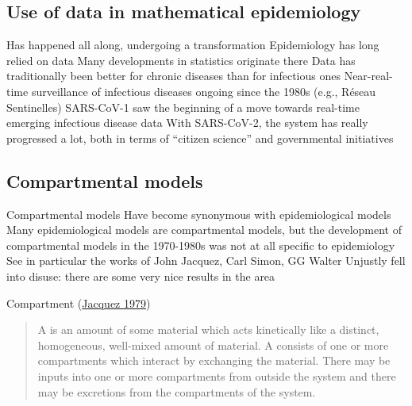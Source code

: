 \documentclass[aspectratio=169]{beamer}\usepackage[]{graphicx}\usepackage[]{xcolor}
\begin{document}
\subsection{Use of data in mathematical epidemiology}


\begin{frame}{Has happened all along, undergoing a transformation}
\bbullet Epidemiology has long relied on data
\vfill
\bbullet Many developments in statistics originate there
\vfill
\bbullet Data has traditionally been better for chronic diseases than for infectious ones
\vfill
\bbullet Near-real-time surveillance of infectious diseases ongoing since the 1980s (e.g., Réseau Sentinelles)
\vfill
\bbullet SARS-CoV-1 saw the beginning of a move towards real-time emerging infectious disease data
\vfill
\bbullet With SARS-CoV-2, the system has really progressed a lot, both in terms of ``citizen science'' and governmental initiatives
\end{frame}



\subsection{Compartmental models}


\begin{frame}{Compartmental models}
\bbullet Have become synonymous with epidemiological models
\vfill
\bbullet Many epidemiological models are compartmental models, but the development of compartmental models in the 1970-1980s was not at all specific to epidemiology
\vfill
\bbullet See in particular the works of John Jacquez, Carl Simon, GG Walter
\vfill
\bbullet Unjustly fell into disuse: there are some very nice results in the area    
\end{frame}

\begin{frame}{Compartment (\href{https://doi-org.uml.idm.oclc.org/10.1016/B978-0-12-434180-7.50021-8}{Jacquez 1979})}

\begin{quote}
  A  is an amount of some material which acts kinetically like a distinct, homogeneous, well-mixed amount of material. A  consists of one or more compartments which interact by exchanging the material. There may be inputs into one or more compartments from outside the system and there may be excretions from the compartments of the system.   
\end{quote}
\end{frame}
\end{document}
